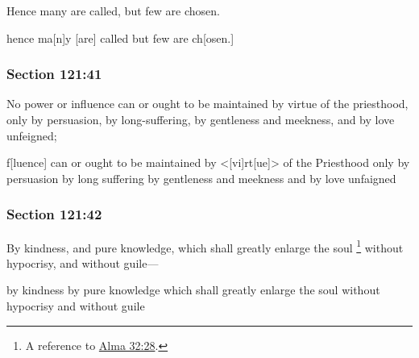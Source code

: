 		Hence many are called, but few are chosen.
		
		\begin{framed}
		\scriptsize
			\begin{compactdesc}
				\item[JSP] hence ma[n]y [are] called but few are ch[osen.]
			\end{compactdesc}
		\end{framed}
		
	\subsubsection{Section 121:41} %
		\label{DC121-41}
		
		No power or influence can or ought to be maintained by virtue of the priesthood, only by persuasion, by long-suffering, by gentleness and meekness, and by love unfeigned;
		
		\begin{framed}
		\scriptsize
			\begin{compactdesc}
				\item[JSP] [No power or in]f[luence] can or ought to be maintained by <[vi]rt[ue]> of the Priesthood only by persuasion by long suffering by gentleness and meekness and by love unfaigned
			\end{compactdesc}
		\end{framed}
		
	\subsubsection{Section 121:42} %
		\label{DC121-42}
		
		By kindness, and pure knowledge, which shall greatly enlarge the soul%
			\footnote{%
				A reference to \hyperref[ALMA-32-28]{Alma 32:28}.
				}
		without hypocrisy, and without guile---
		
		\begin{framed}
		\scriptsize
			\begin{compactdesc}
				\item[JSP] by kindness by pure knowledge which shall greatly enlarge the soul without hypocrisy and without guile
			\end{compactdesc}
		\end{framed}
		

